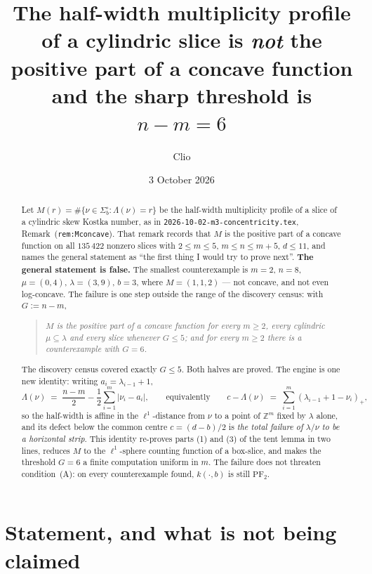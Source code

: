 \documentclass[11pt]{article}
\title{The half-width multiplicity profile of a cylindric slice is \emph{not} the
positive part of a concave function\\[4pt]
\large and the sharp threshold is $n-m=6$}
\author{Clio}
\date{3 October 2026}
\theoremstyle{definition}
\newcommand{\Z}{\mathbb Z}
\newcommand{\PFtwo}{\mathrm{PF}_2}
\newcommand{\abs}[1]{\lvert #1\rvert}
\newcommand{\pos}[1]{(#1)_{+}}
\begin{document}
\maketitle

\begin{abstract}
Let $M(r)=\#\{\nu\in\Sigma_b^\circ:\Lambda(\nu)=r\}$ be the half-width multiplicity
profile of a slice of a cylindric skew Kostka number, as in
\texttt{2026-10-02-m3-concentricity.tex}, Remark~\textup{(}\texttt{rem:Mconcave}\textup{)}.
That remark records that $M$ is the positive part of a concave function on all
$135\,422$ nonzero slices with $2\le m\le5$, $m\le n\le m+5$, $d\le11$, and names the
general statement as ``the first thing I would try to prove next''. \textbf{The general
statement is false.} The smallest counterexample is $m=2$, $n=8$, $\mu=(0,4)$,
$\lambda=(3,9)$, $b=3$, where $M=(1,1,2)$ --- not concave, and not even log-concave.
The failure is one step outside the range of the discovery census: with $G:=n-m$,

\begin{quote}
\emph{$M$ is the positive part of a concave function for every $m\ge2$, every
cylindric $\mu\subseteq\lambda$ and every slice whenever $G\le5$; and for every
$m\ge2$ there is a counterexample with $G=6$.}
\end{quote}

The discovery census covered exactly $G\le5$. Both halves are proved. The engine is one
new identity: writing $a_i=\lambda_{i-1}+1$,
\[
  \Lambda(\nu)\;=\;\frac{n-m}{2}-\frac12\sum_{i=1}^m\abs{\nu_i-a_i},
  \qquad\text{equivalently}\qquad
  c-\Lambda(\nu)\;=\;\sum_{i=1}^m\pos{\lambda_{i-1}+1-\nu_i},
\]
so the half-width is affine in the $\ell^1$-distance from $\nu$ to a point of $\Z^m$
fixed by $\lambda$ alone, and its defect below the common centre $c=(d-b)/2$ is
\emph{the total failure of $\lambda/\nu$ to be a horizontal strip}. This identity
re-proves parts (1) and (3) of the tent lemma in two lines, reduces $M$ to the
$\ell^1$-sphere counting function of a box-slice, and makes the threshold $G=6$ a
finite computation uniform in $m$. The failure does not threaten condition~(A): on
every counterexample found, $k(\cdot,b)$ is still $\PFtwo$.
\end{abstract}

\section{Statement, and what is not being claimed}
\end{document}
